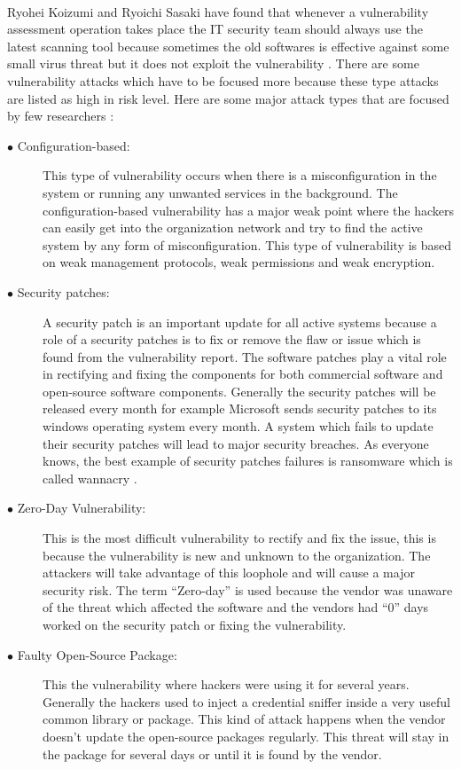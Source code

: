 \paragraph{}
Ryohei Koizumi and Ryoichi Sasaki have found that whenever a vulnerability assessment operation takes place the IT security team should always use the latest scanning tool because sometimes the old softwares is effective against some small virus threat but it does not exploit the vulnerability \cite{KoSa2015}. There are some vulnerability attacks which have to be focused more because these type attacks are listed as high in risk level. Here are some major attack types that are focused by few researchers \cite{AlAl2015}:
\begin{description}
	\item [$\bullet$ Configuration-based:] This type of vulnerability occurs when there is a misconfiguration in the system or running any unwanted services in the background. The configuration-based vulnerability has a major weak point where the hackers can easily get into the organization network and try to find the active system by any form of misconfiguration. This type of vulnerability is based on weak management protocols, weak permissions and weak encryption.
	
	\item [$\bullet$ Security patches:] A security patch is an important update for all active systems because a role of a security patches is to fix or remove the flaw or issue which is found from the vulnerability report. The software patches play a vital role in rectifying and fixing the components for both commercial software and open-source software components. Generally the security patches will be released every month for example Microsoft sends security patches to its windows operating system every month. A system which fails to update their security patches will lead to major security breaches. As everyone knows, the best example of security patches failures is ransomware which is called wannacry \cite{Kaspersky}.
	
	\item [$\bullet$ Zero-Day Vulnerability:] This is the most difficult vulnerability to rectify and fix the issue, this is because the vulnerability is new and unknown to the organization. The attackers will take advantage of this loophole and will cause a major security risk. The term “Zero-day” is used because the vendor was unaware of the threat which affected the software and the vendors had “0” days worked on the security patch or fixing the vulnerability.
	
	\item [$\bullet$ Faulty Open-Source Package:] This the vulnerability where hackers were using it for several years. Generally the hackers used to inject a credential sniffer inside a very useful common library or package. This kind of attack happens when the vendor doesn’t update the open-source packages regularly. This threat will stay in the package for several days or until it is found by the vendor.
\end{description}

